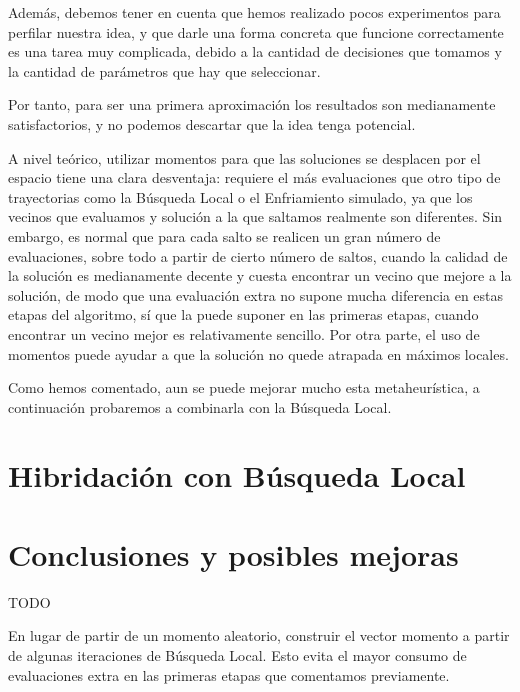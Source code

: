 \documentclass{article}
\begin{document}
Además, debemos tener en cuenta que hemos realizado pocos experimentos para perfilar nuestra idea, y que darle una forma concreta
que funcione correctamente es una tarea muy complicada, debido a la cantidad de decisiones que tomamos y la cantidad de parámetros que
hay que seleccionar.

Por tanto, para ser una primera aproximación los resultados son medianamente satisfactorios, y no podemos descartar que la idea tenga
potencial.

A nivel teórico, utilizar momentos para que las soluciones se desplacen por el espacio tiene una clara desventaja: requiere
el más evaluaciones que otro tipo de trayectorias como la Búsqueda Local o el Enfriamiento simulado, ya que los vecinos que evaluamos
y solución a la que saltamos realmente son diferentes. Sin embargo, es normal que para cada salto se realicen un gran número de
evaluaciones, sobre todo a partir de cierto número de saltos, cuando la calidad de la solución es medianamente decente y cuesta encontrar
un vecino que mejore a la solución, de modo que una evaluación extra no supone mucha diferencia en estas etapas del algoritmo, sí que 
la puede suponer en las primeras etapas, cuando encontrar un vecino mejor es relativamente sencillo. Por otra parte, el uso de momentos
puede ayudar a que la solución no quede atrapada en máximos locales.

Como hemos comentado, aun se puede mejorar mucho esta metaheurística, a continuación probaremos a combinarla con la Búsqueda Local.

\section{Hibridación con Búsqueda Local}



\section{Conclusiones y posibles mejoras}

TODO

En lugar de partir de un momento aleatorio, construir el vector momento a partir de algunas iteraciones de Búsqueda Local. Esto evita
el mayor consumo de evaluaciones extra en las primeras etapas que comentamos previamente. 
\end{document}

